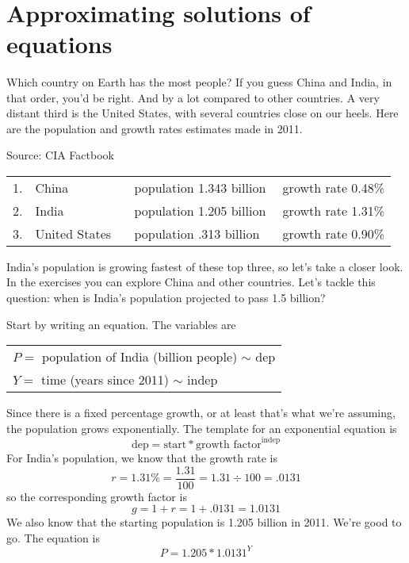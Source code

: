 ~\vspace{.1in}

\section{Approximating solutions of equations}

Which country on Earth has the most people?  If you guess China and India, in that order, you'd be right.  And by a lot compared to other countries.  A very distant third is the United States, with several countries close on our heels.  Here are the population and growth rates estimates made in 2011.  \hfill \begin{footnotesize} Source:  CIA Factbook \end{footnotesize}
\begin{center}
\begin{tabular} {llll}
1. & China & population 1.343 billion & growth rate 0.48\% \\
2. & India & population 1.205 billion & growth rate 1.31\%\\
3. & United States \quad~& population \hspace{.07 in}.313 billion \quad~  & growth rate 0.90\%\\   %
\end{tabular}
\end{center} 

India's population is growing fastest of these top three, so let's take a closer look.  In the exercises you can explore China and other countries. 
Let's tackle this question: when is India's population projected to pass 1.5 billion?

Start by writing an equation.  The variables are
\begin{center}
\begin{tabular} {l} 
$P=$ population of India (billion people) $\sim$ dep \\
$Y= $ time (years since 2011) $\sim$ indep \\ 
\end{tabular}
\end{center}
Since there is a fixed percentage growth, or at least that's what we're assuming, the population grows exponentially.  The template for an exponential equation is 
$$\text{dep} = \text{start} \ast \text{growth factor} ^ {\text{indep}}$$
For India's population, we know that the growth rate is 
$$r=1.31\% = \frac{1.31}{100} = 1.31 \div 100 = .0131$$
so the corresponding growth factor is 
$$g=1+r=1+.0131=1.0131$$
We also know that the starting population is 1.205 billion in 2011.  We're good to go. The equation is
$$P = 1.205 \ast 1.0131^Y$$

